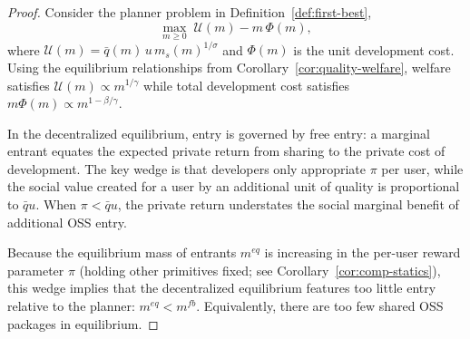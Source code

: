 \documentclass[11pt,a4paper]{article}
\theoremstyle{definition}
\theoremstyle{remark}
\begin{document}
\begin{proof}
Consider the planner problem in Definition~\ref{def:first-best},
\[
\max_{m\ge 0}\; \mathcal{U}(m) - m\,\Phi(m),
\]
where $\mathcal{U}(m)=\bar{q}(m)\,u\,m_s(m)^{1/\sigma}$ and $\Phi(m)$ is the unit development cost. Using the equilibrium relationships from Corollary~\ref{cor:quality-welfare}, welfare satisfies $\mathcal{U}(m)\propto m^{1/\gamma}$ while total development cost satisfies $m\Phi(m)\propto m^{1-\beta/\gamma}$.

In the decentralized equilibrium, entry is governed by free entry: a marginal entrant equates the expected private return from sharing to the private cost of development. The key wedge is that developers only appropriate $\pi$ per user, while the social value created for a user by an additional unit of quality is proportional to $\bar{q}u$. When $\pi<\bar{q}u$, the private return understates the social marginal benefit of additional OSS entry.

Because the equilibrium mass of entrants $m^{eq}$ is increasing in the per-user reward parameter $\pi$ (holding other primitives fixed; see Corollary~\ref{cor:comp-statics}), this wedge implies that the decentralized equilibrium features too little entry relative to the planner: $m^{eq}<m^{fb}$. Equivalently, there are too few shared OSS packages in equilibrium.
\end{proof}
\end{document}
